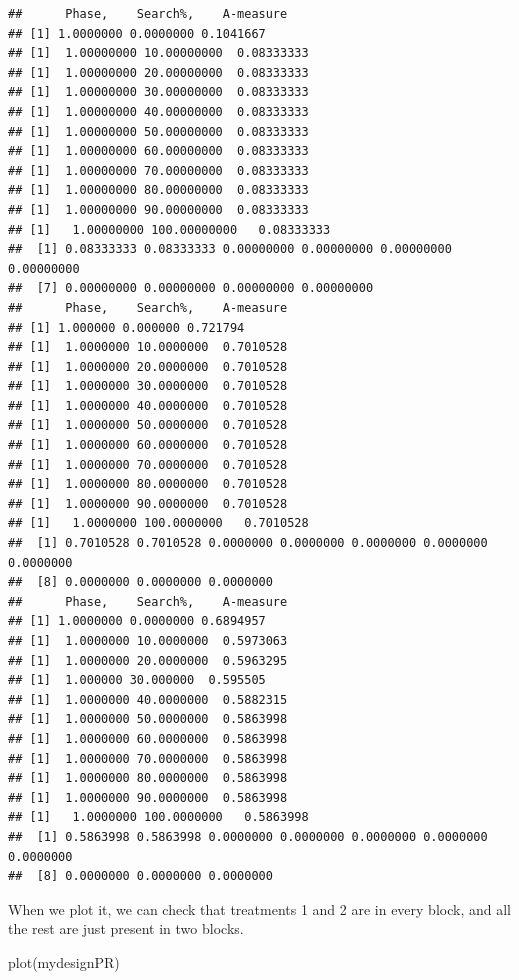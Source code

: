\documentclass[
]{book}
\newenvironment{Shaded}{\begin{snugshade}}{\end{snugshade}}
\newcommand{\FunctionTok}[1]{\textcolor[rgb]{0.00,0.00,0.00}{#1}}
\newcommand{\NormalTok}[1]{#1}
\begin{document}
\begin{verbatim}
##      Phase,    Search%,    A-measure
## [1] 1.0000000 0.0000000 0.1041667
## [1]  1.00000000 10.00000000  0.08333333
## [1]  1.00000000 20.00000000  0.08333333
## [1]  1.00000000 30.00000000  0.08333333
## [1]  1.00000000 40.00000000  0.08333333
## [1]  1.00000000 50.00000000  0.08333333
## [1]  1.00000000 60.00000000  0.08333333
## [1]  1.00000000 70.00000000  0.08333333
## [1]  1.00000000 80.00000000  0.08333333
## [1]  1.00000000 90.00000000  0.08333333
## [1]   1.00000000 100.00000000   0.08333333
##  [1] 0.08333333 0.08333333 0.00000000 0.00000000 0.00000000 0.00000000
##  [7] 0.00000000 0.00000000 0.00000000 0.00000000
##      Phase,    Search%,    A-measure
## [1] 1.000000 0.000000 0.721794
## [1]  1.0000000 10.0000000  0.7010528
## [1]  1.0000000 20.0000000  0.7010528
## [1]  1.0000000 30.0000000  0.7010528
## [1]  1.0000000 40.0000000  0.7010528
## [1]  1.0000000 50.0000000  0.7010528
## [1]  1.0000000 60.0000000  0.7010528
## [1]  1.0000000 70.0000000  0.7010528
## [1]  1.0000000 80.0000000  0.7010528
## [1]  1.0000000 90.0000000  0.7010528
## [1]   1.0000000 100.0000000   0.7010528
##  [1] 0.7010528 0.7010528 0.0000000 0.0000000 0.0000000 0.0000000 0.0000000
##  [8] 0.0000000 0.0000000 0.0000000
##      Phase,    Search%,    A-measure
## [1] 1.0000000 0.0000000 0.6894957
## [1]  1.0000000 10.0000000  0.5973063
## [1]  1.0000000 20.0000000  0.5963295
## [1]  1.000000 30.000000  0.595505
## [1]  1.0000000 40.0000000  0.5882315
## [1]  1.0000000 50.0000000  0.5863998
## [1]  1.0000000 60.0000000  0.5863998
## [1]  1.0000000 70.0000000  0.5863998
## [1]  1.0000000 80.0000000  0.5863998
## [1]  1.0000000 90.0000000  0.5863998
## [1]   1.0000000 100.0000000   0.5863998
##  [1] 0.5863998 0.5863998 0.0000000 0.0000000 0.0000000 0.0000000 0.0000000
##  [8] 0.0000000 0.0000000 0.0000000
\end{verbatim}

When we plot it, we can check that treatments 1 and 2 are in every block, and all the rest are just present in two blocks.

\begin{Shaded}
\begin{Highlighting}[]
\FunctionTok{plot}\NormalTok{(mydesignPR) }
\end{Highlighting}
\end{Shaded}
\end{document}
